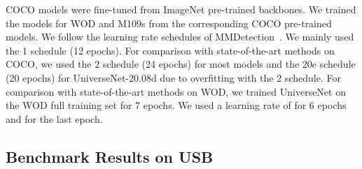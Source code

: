 \documentclass[10pt,twocolumn,letterpaper]{article}
\newcommand{\OurOrig}{UniverseNet\xspace}
\newcommand{\OurAugustD}{UniverseNet-20.08d\xspace}
\newcommand{\MangasAbbr}{M109s\xspace}
\begin{document}
COCO models were fine-tuned from ImageNet pre-trained backbones.
We trained the models for WOD and \MangasAbbr from the corresponding COCO pre-trained models.
We follow the learning rate schedules of MMDetection~\cite{MMDetection}.
We mainly used the 1 schedule (12 epochs).
For comparison with state-of-the-art methods on COCO,
we used the 2 schedule (24 epochs) for most models
and the 20e schedule (20 epochs) for \OurAugustD due to overfitting with the 2 schedule.
For comparison with state-of-the-art methods on WOD,
we trained \OurOrig on the WOD full training set for 7 epochs.
We used a learning rate of  for 6 epochs and  for the last epoch.




\subsection{Benchmark Results on USB}
\label{sec:usb_results}
\end{document}
